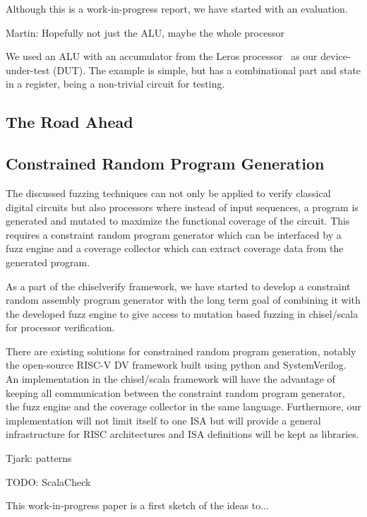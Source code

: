 \documentclass[conference]{IEEEtran}
\newcommand{\todo}[1]{{\color{olive} TODO: #1}}
\newcommand{\martin}[1]{{\color{blue} Martin: #1}}
\newcommand{\tjark}[1]{{\color{orange} Tjark: #1}}
\begin{document}
Although this is a work-in-progress report, we have started with an evaluation.

\martin{Hopefully not just the ALU, maybe the whole processor}

We used an ALU with an accumulator from the Leros processor~\cite{leros:arcs2019}
as our device-under-test (DUT).
The example is simple, but has a combinational part and state in a register, being
a non-trivial circuit for testing.







\subsection{The Road Ahead}

\subsection{Constrained Random Program Generation}

The discussed fuzzing techniques can not only be applied to verify classical digital circuits but also processors where instead of input sequences, a program is generated and mutated to maximize the functional coverage of the circuit. This requires a constraint random program generator which can be interfaced by a fuzz engine and a coverage collector which can extract coverage data from the generated program. 

As a part of the chiselverify framework, we have started to develop a constraint random assembly program generator with the long term goal of combining it with the developed fuzz engine to give access to mutation based fuzzing in chisel/scala for processor verification.

There are existing solutions for constrained random program generation, notably the open-source RISC-V DV framework \cite{riscvdv} built using python and SystemVerilog. An implementation in the chisel/scala framework will have the advantage of keeping all communication between the constraint random program generator, the fuzz engine and the coverage collector in the same language. Furthermore, our implementation will not limit itself to one ISA but will provide a general infrastructure for RISC architectures and ISA definitions will be kept as libraries.

\tjark{patterns}


\todo{ScalaCheck}

This work-in-progress paper is a first sketch of the ideas to...
\end{document}
